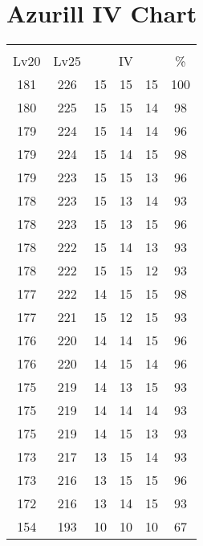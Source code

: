 \documentclass{article}%
\begin{document}
%
\normalsize%
\section{Azurill IV Chart}%
\label{sec:Azurill IV Chart}%
\renewcommand{\arraystretch}{1.5}%
\begin{tabular}{|c|c|c|c|c|c|}%
\hline%
\multicolumn{6}{|c|}{\textcolor{white}{ 
\linebreak{Azurill}
}%
\cellcolor{black}}\\%
\multicolumn{1}{|c}{Lv20}&\multicolumn{1}{c|}{Lv25}&\multicolumn{3}{c|}{IV}&\multicolumn{1}{|c|}{\%}\\%
\hline%
\rowcolor{color100}%
181&226&15&15&15&100\\%
\hline%
\rowcolor{color98}%
180&225&15&15&14&98\\%
\hline%
\rowcolor{color96}%
179&224&15&14&14&96\\%
\hline%
\rowcolor{color98}%
179&224&15&14&15&98\\%
\hline%
\rowcolor{color96}%
179&223&15&15&13&96\\%
\hline%
\rowcolor{color93}%
178&223&15&13&14&93\\%
\hline%
\rowcolor{color96}%
178&223&15&13&15&96\\%
\hline%
\rowcolor{color93}%
178&222&15&14&13&93\\%
\hline%
\rowcolor{color93}%
178&222&15&15&12&93\\%
\hline%
\rowcolor{color98}%
177&222&14&15&15&98\\%
\hline%
\rowcolor{color93}%
177&221&15&12&15&93\\%
\hline%
\rowcolor{color96}%
176&220&14&14&15&96\\%
\hline%
\rowcolor{color96}%
176&220&14&15&14&96\\%
\hline%
\rowcolor{color93}%
175&219&14&13&15&93\\%
\hline%
\rowcolor{color93}%
175&219&14&14&14&93\\%
\hline%
\rowcolor{color93}%
175&219&14&15&13&93\\%
\hline%
\rowcolor{color93}%
173&217&13&15&14&93\\%
\hline%
\rowcolor{color96}%
173&216&13&15&15&96\\%
\hline%
\rowcolor{color93}%
172&216&13&14&15&93\\%
\hline%
\rowcolor{color91}%
154&193&10&10&10&67\\%
\end{tabular}

%
\end{document}
